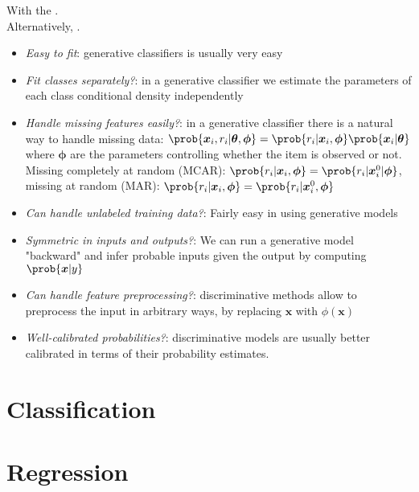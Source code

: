 With the .\\
Alternatively, .

\begin{itemize}
    \item \emph{Easy to fit}: generative classifiers is usually very easy
    \item \emph{Fit classes separately?}: in a generative classifier we estimate the parameters 
        of each class conditional density independently
    \item \emph{Handle missing features easily?}: in a generative classifier there is a natural way
        to handle missing data: $\prob{\bm{x}_{i},r_{i}|\bm{\theta},\bm{\phi}} = \prob{r_{i}|\bm{
        x}_{i},\bm{\phi}}\prob{\bm{x}_{i}|\bm{\theta}}$ where $\bm{\phi}$ are the parameters
        controlling whether the item is observed or not. Missing completely at random (MCAR): $\prob{
        r_{i}|\bm{x}_{i},\bm{\phi}} = \prob{r_{i}|\bm{x}^{0}_{i}|\bm{\phi}}$, missing at random 
        (MAR): $\prob{r_{i}|\bm{x}_{i},\bm{\phi}} = \prob{r_{i}|\bm{x}^{0}_{i},\bm{\phi}}$
    \item \emph{Can handle unlabeled training data?}: Fairly easy in using generative models
    \item \emph{Symmetric in inputs and outputs?}: We can run a generative model "backward" and 
        infer probable inputs given the output by computing $\prob{\bm{x}|y}$
    \item \emph{Can handle feature preprocessing?}: discriminative methods allow to preprocess the
        input in arbitrary ways, by replacing $\bm{x}$ with $\phi(\bm{x})$
    \item \emph{Well-calibrated probabilities?}: discriminative models are usually better calibrated
        in terms of their probability estimates.
\end{itemize}


\section{Classification}


\section{Regression}


